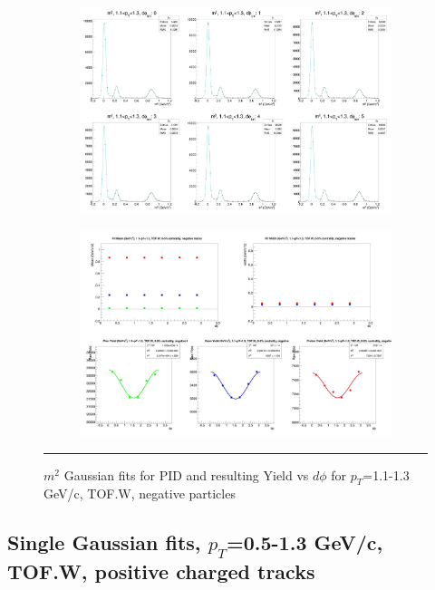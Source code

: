 \begin{figure}[H]
  \centering
    \begin{subfigure}[p]{1\textwidth}
    \includegraphics[width=1\textwidth]{lowptfits/yieldvsdphi_tof1_cent0_ch0_pT-11-13.jpg}
    \end{subfigure}
    \begin{subfigure}[p]{1\textwidth}
    \includegraphics[width=1\textwidth]{lowptfits/fitParams_tof1_cent0_ch0_pT-11-13.jpg}
    \end{subfigure}
    \rule{35em}{0.5pt}
  \caption[PID fits and Yield vs $d\phi$ for $p_T$=1.1-1.3 GeV/c, TOF.W, negative particles ]{$m^2$ Gaussian fits for PID and resulting Yield vs $d\phi$ for $p_T$=1.1-1.3 GeV/c, TOF.W, negative particles}
  \label{fig:fits11-13neg}
\end{figure}

\subsection{Single Gaussian fits, $p_T$=0.5-1.3 GeV/c, TOF.W, positive charged tracks}

